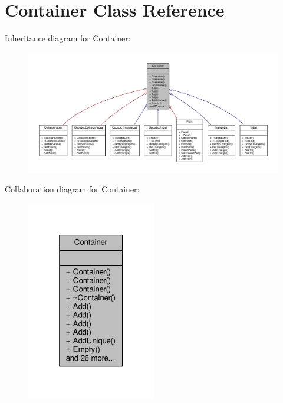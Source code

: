 \hypertarget{classContainer}{}\section{Container Class Reference}
\label{classContainer}


Inheritance diagram for Container\+:
\nopagebreak
\begin{figure}[H]
\begin{center}
\leavevmode
\includegraphics[width=350pt]{da/d71/classContainer__inherit__graph}
\end{center}
\end{figure}


Collaboration diagram for Container\+:
\nopagebreak
\begin{figure}[H]
\begin{center}
\leavevmode
\includegraphics[width=160pt]{d3/d25/classContainer__coll__graph}
\end{center}
\end{figure}
